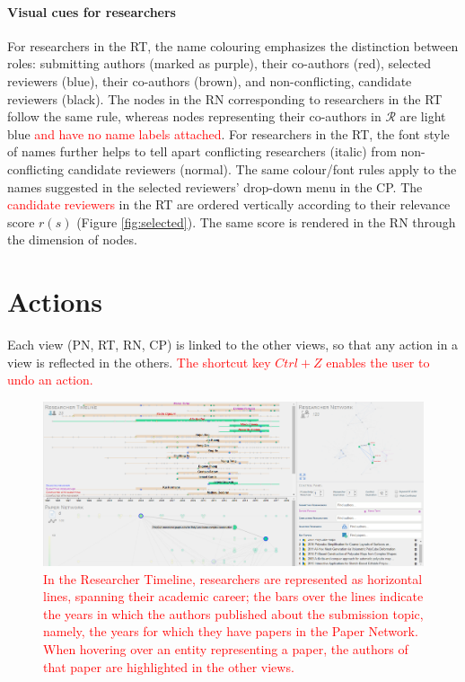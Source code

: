 \paragraph*{Visual cues for researchers} 
For researchers in the RT, the name colouring emphasizes the distinction between roles: submitting authors (marked as purple), their co-authors (red), selected reviewers (blue), their co-authors (brown), and non-conflicting, candidate reviewers (black). The nodes in the RN corresponding to researchers in the RT follow the same rule, whereas nodes representing their co-authors in $\mathcal{R}$ are light blue \textcolor{red}{and have no name labels attached}.   
For researchers in the RT, the font style of names further helps to tell apart conflicting researchers (italic) from non-conflicting candidate reviewers (normal). The same colour/font rules apply to the names suggested in the selected reviewers' drop-down menu in the CP.
The \textcolor{red}{candidate reviewers} in the RT are ordered vertically according to their relevance score $r(s)$ (Figure \ref{fig:selected}). The same score is rendered in the RN through the dimension of nodes.  

\section{Actions}
\label{subsec:actions}

Each view (PN, RT, RN, CP) is linked to the other views, so that any action in a view is reflected in the others. \textcolor{red}{The shortcut key $Ctrl+Z$ enables the user to undo an action.}

\begin{figure}[!t]
    \centering
    \includegraphics[width=\textwidth]{fig/timeline_paperhover.png}
    \caption{\textcolor{red}{In the Researcher Timeline, researchers are represented as horizontal lines, spanning their academic career; the bars over the lines indicate the years in which the authors published about the submission topic, namely, the years for which they have papers in the Paper Network. When hovering over an entity representing a paper, the authors of that paper are highlighted in the other views.}}
    \label{fig:overpaper}
\end{figure}

